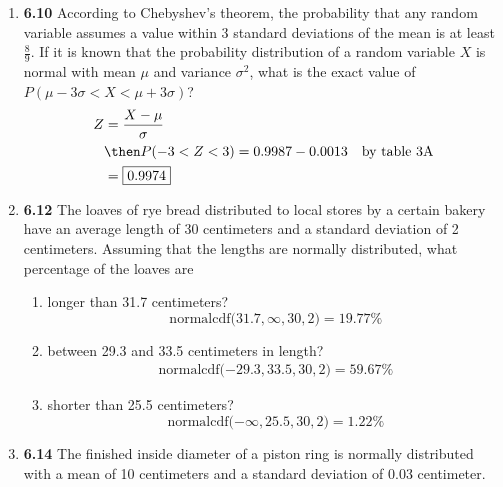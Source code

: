 \documentclass[basic, header]{nosvagor-notes}
\begin{document}
\begin{enumerate}[itemsep=4em]

  \item \textbf{6.10} According to Chebyshev’s theorem, the probability that any
    random variable assumes a value within 3 standard deviations of the mean is
    at least \(\frac{8}{9}\). If it is known that the probability distribution of a random
    variable \(X\) is normal with mean \(\mu\) and variance \(\sigma^2\), what is the exact value
    of \(P(\mu - 3\sigma < X < \mu + 3\sigma)\)?
    \begin{align*}
      Z &= \frac{X - \mu}{\sigma} \\
        &\then P(-3 < Z < 3) = 0.9987 - 0.0013 & \text{by table 3A}\\
        &= \boxed{0.9974}
    \end{align*}

  \item \textbf{6.12} The loaves of rye bread distributed to local stores by a certain
    bakery have an average length of 30 centimeters and a standard deviation of
    2 centimeters. Assuming that the lengths are normally distributed, what
    percentage of the loaves are
    \begin{enumerate}

      \item longer than 31.7 centimeters?
        \[%
          \text{normalcdf($31.7,\infty,30,2$)} = \boxed{19.77\%}
        \]%

      \item between 29.3 and 33.5 centimeters in length?
        \begin{align*}
              \text{normalcdf($-29.3,33.5,30,2$)} = \boxed{59.67\%}
        \end{align*}

      \item shorter than 25.5 centimeters?
        \[%
          \text{normalcdf($-\infty,25.5,30,2$)} = \boxed{1.22\%}
        \]%
    \end{enumerate}

  \item \textbf{6.14} The finished inside diameter of a piston ring is normally
    distributed with a mean of 10 centimeters and a standard deviation of 0.03
    centimeter.
    \begin{enumerate}


\end{enumerate}
\end{enumerate}
\end{document}
